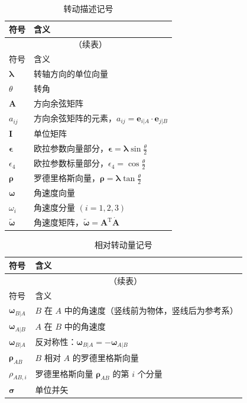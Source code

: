\begin{longtable}{ll}
	\caption{转动描述记号}\label{tab:符号说明:转动}\\
	\toprule
	符号 & 含义 \\
	\midrule
	\endfirsthead
	\multicolumn{2}{c}{\tablename~\thetable{}（续表）}\\
	\toprule
	符号 & 含义 \\
	\midrule
	\endhead
	$\bm{\lambda}$ & 转轴方向的单位向量 \\
	$\theta$ & 转角 \\
	$\bm{A}$ & 方向余弦矩阵 \\
	$a_{ij}$ & 方向余弦矩阵的元素，$a_{ij}=\mathbf{e}_{i|A}\cdot\mathbf{e}_{j|B}$ \\
	$\bm{I}$ & 单位矩阵 \\
	$\bm{\epsilon}$ & 欧拉参数向量部分，$\bm{\epsilon}=\bm{\lambda}\sin\frac{\theta}{2}$ \\
	$\epsilon_{4}$ & 欧拉参数标量部分，$\epsilon_{4}=\cos\frac{\theta}{2}$ \\
	$\bm{\rho}$ & 罗德里格斯向量，$\bm{\rho}=\bm{\lambda}\tan\frac{\theta}{2}$ \\
	$\bm{\omega}$ & 角速度向量 \\
	$\omega_i$ & 角速度分量 $(i=1,2,3)$ \\
	$\bm{\tilde{\omega}}$ & 角速度矩阵，$\bm{\tilde{\omega}}=\bm{A}^{\mathrm{T}}\dot{\bm{A}}$ \\
	\bottomrule
\end{longtable}

\begin{longtable}{ll}
	\caption{相对转动量记号}\label{tab:符号说明:相对量}\\
	\toprule
	符号 & 含义 \\
	\midrule
	\endfirsthead
	\multicolumn{2}{c}{\tablename~\thetable{}（续表）}\\
	\toprule
	符号 & 含义 \\
	\midrule
	\endhead
	$\bm{\omega}_{B|A}$ & $B$ 在 $A$ 中的角速度（竖线前为物体，竖线后为参考系） \\
	$\bm{\omega}_{A|B}$ & $A$ 在 $B$ 中的角速度 \\
	$\bm{\omega}_{B|A}$ & 反对称性：$\bm{\omega}_{B|A}=-\bm{\omega}_{A|B}$ \\
	$\bm{\rho}_{AB}$ & $B$ 相对 $A$ 的罗德里格斯向量 \\
	$\rho_{AB,i}$ & 罗德里格斯向量 $\bm{\rho}_{AB}$ 的第 $i$ 个分量 \\
	$\bm{\sigma}$ & 单位并矢 \\
	\bottomrule
\end{longtable}

